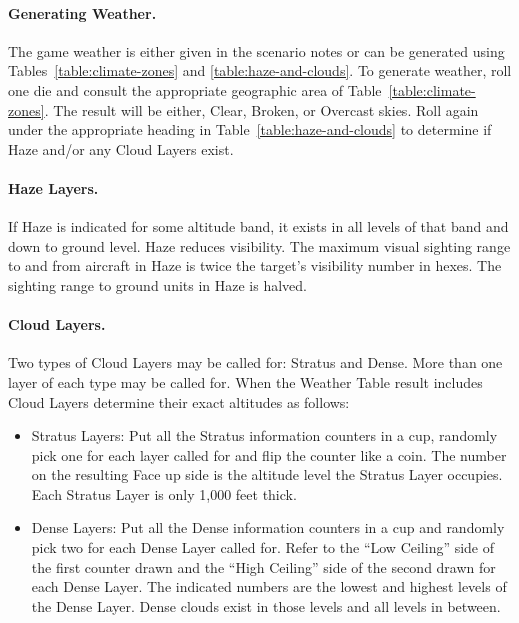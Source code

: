 \begin{advancedrules}
{\paragraph{Generating Weather.} The game weather is either given in the scenario notes or can be generated using Tables~\ref{table:climate-zones} and \ref{table:haze-and-clouds}. To generate weather, roll one die and consult the appropriate geographic area of Table~\ref{table:climate-zones}. The result will be either, Clear, Broken, or Overcast skies. Roll again under the appropriate heading in Table~\ref{table:haze-and-clouds} to determine if Haze and/or any Cloud Layers exist.
}

\paragraph{Haze Layers.} If Haze is indicated for some altitude band, it exists in all levels of that band and down to ground level. Haze reduces visibility. The maximum visual sighting range to and from aircraft in Haze is twice the target's visibility number in hexes. The sighting range to ground units in Haze is halved.

\paragraph{Cloud Layers.} Two types of Cloud Layers may be called for: Stratus and Dense. More than one layer of each type may be called for. When the Weather Table result includes Cloud Layers determine their exact altitudes as follows:

\begin{itemize}
    \item Stratus Layers: Put all the Stratus information counters in a cup, randomly pick one for each layer called for and flip the counter like a coin. The number on the resulting Face up side is the altitude level the Stratus Layer occupies. Each Stratus Layer is only 1,000 feet thick.

    \item Dense Layers: Put all the Dense information counters in a cup and randomly pick two for each Dense Layer called for. Refer to the “Low Ceiling” side of the first counter drawn and the “High Ceiling” side of the second drawn for each Dense Layer. The indicated numbers are the lowest and highest levels of the Dense Layer. Dense clouds exist in those levels and all levels in between.   
\end{itemize}



\end{advancedrules}

